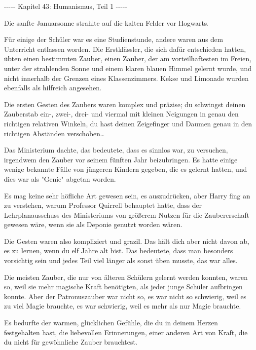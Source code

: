 

\hypertarget{humanismus-teil-1}{%

-\/-\/-\/-\/- Kapitel 43: Humanismus, Teil 1 -\/-\/-\/-\/-

Die sanfte Januarsonne strahlte auf die kalten Felder vor Hogwarts.

Für einige der Schüler war es eine Studienstunde, andere waren aus dem Unterricht entlassen worden. Die Erstklässler, die sich dafür entschieden hatten, übten einen bestimmten Zauber, einen Zauber, der am vorteilhaftesten im Freien, unter der strahlenden Sonne und einem klaren blauen Himmel gelernt wurde, und nicht innerhalb der Grenzen eines Klassenzimmers. Kekse und Limonade wurden ebenfalls als hilfreich angesehen.

Die ersten Gesten des Zaubers waren komplex und präzise; du schwingst deinen Zauberstab ein-, zwei-, drei- und viermal mit kleinen Neigungen in genau den richtigen relativen Winkeln, du hast deinen Zeigefinger und Daumen genau in den richtigen Abständen verschoben…

Das Ministerium dachte, das bedeutete, dass es sinnlos war, zu versuchen, irgendwem den Zauber vor seinem fünften Jahr beizubringen. Es hatte einige wenige bekannte Fälle von jüngeren Kindern gegeben, die es gelernt hatten, und dies war als "Genie" abgetan worden.

Es mag keine sehr höfliche Art gewesen sein, es auszudrücken, aber Harry fing an zu verstehen, warum Professor Quirrell behauptet hatte, dass der Lehrplanausschuss des Ministeriums von größerem Nutzen für die Zaubererschaft gewesen wäre, wenn sie als Deponie genutzt worden wären.

Die Gesten waren also kompliziert und grazil. Das hält dich aber nicht davon ab, es zu lernen, wenn du elf Jahre alt bist. Das bedeutete, dass man besonders vorsichtig sein und jedes Teil viel länger als sonst üben musste, das war alles.

Die meisten Zauber, die nur von älteren Schülern gelernt werden konnten, waren so, weil sie mehr magische Kraft benötigten, als jeder junge Schüler aufbringen konnte. Aber der Patronuszauber war nicht so, es war nicht so schwierig, weil es zu viel Magie brauchte, es war schwierig, weil es mehr als nur Magie brauchte.

Es bedurfte der warmen, glücklichen Gefühle, die du in deinem Herzen festgehalten hast, die liebevollen Erinnerungen, einer anderen Art von Kraft, die du nicht für gewöhnliche Zauber brauchtest.

}
